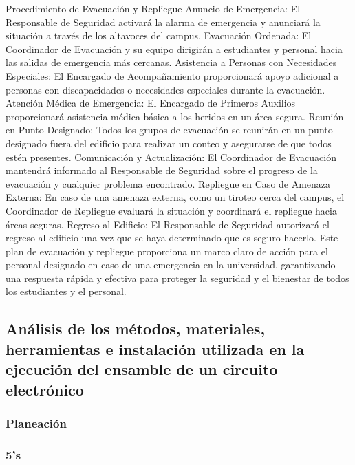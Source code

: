     Procedimiento de Evacuación y Repliegue
    Anuncio de Emergencia:
    El Responsable de Seguridad activará la alarma de emergencia y anunciará la situación a través de los
    altavoces del campus.
    Evacuación Ordenada:
    El Coordinador de Evacuación y su equipo dirigirán a estudiantes y personal hacia las salidas de
    emergencia más cercanas.
    Asistencia a Personas con Necesidades Especiales:
    El Encargado de Acompañamiento proporcionará apoyo adicional a personas con discapacidades o
    necesidades especiales durante la evacuación.
    Atención Médica de Emergencia:
    El Encargado de Primeros Auxilios proporcionará asistencia médica básica a los heridos en un área
    segura.
    Reunión en Punto Designado:
    Todos los grupos de evacuación se reunirán en un punto designado fuera del edificio para realizar un
    conteo y asegurarse de que todos estén presentes.
    Comunicación y Actualización:
    El Coordinador de Evacuación mantendrá informado al Responsable de Seguridad sobre el progreso
    de la evacuación y cualquier problema encontrado.
    Repliegue en Caso de Amenaza Externa:
    En caso de una amenaza externa, como un tiroteo cerca del campus, el Coordinador de Repliegue
    evaluará la situación y coordinará el repliegue hacia áreas seguras.
    Regreso al Edificio:
    El Responsable de Seguridad autorizará el regreso al edificio una vez que se haya determinado que es
    seguro hacerlo.
    Este plan de evacuación y repliegue proporciona un marco claro de acción para el personal
    designado en caso de una emergencia en la universidad, garantizando una respuesta rápida y
    efectiva para proteger la seguridad y el bienestar de todos los estudiantes y el personal.
    
    \subsection{Análisis de los métodos, materiales, herramientas e instalación utilizada en la ejecución del ensamble de un circuito electrónico}
    
    \subsubsection{Planeación}
    
    \subsubsection{5's}
    

